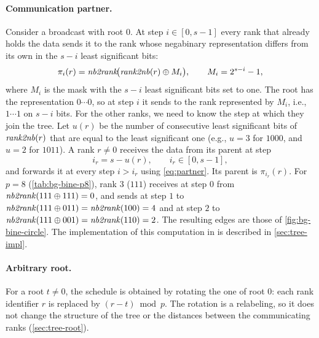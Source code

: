 \paragraph{Communication partner.}
Consider a broadcast with root $0$.
At step $i\in[0,s-1]$ every rank that already holds the data sends it to the rank whose negabinary representation differs from its own in the $s-i$ least significant bits:
\begin{equation}
  \pi_i(r)=\mathit{nb2rank}\!\bigl(\mathit{rank2nb}(r)\oplus M_i\bigr),\qquad M_i=2^{s-i}-1,
  \label{eq:partner}
\end{equation}
where $M_i$ is the mask with the $s-i$ least significant bits set to one.
The root has the representation $0\cdots0$, so at step $i$ it sends to the rank represented by $M_i$, i.e., $1\cdots1$ on $s-i$ bits.
For the other ranks, we need to know the step at which they join the tree.
Let $u(r)$ be the number of consecutive least significant bits of $\mathit{rank2nb}(r)$ that are equal to the least significant one (e.g., $u=3$ for $1000$, and $u=2$ for $1011$).
A rank $r\neq0$ receives the data from its parent at step
\begin{equation}
  i_r=s-u(r),\qquad i_r\in[0,s-1],
  \label{eq:recv-step}
\end{equation}
and forwards it at every step $i>i_r$ using \cref{eq:partner}.
Its parent is $\pi_{i_r}(r)$.
For $p=8$ (\cref{tab:bg-bine-p8}), rank $3$ ($111$) receives at step $0$ from $\mathit{nb2rank}(111\oplus111)=0$, and sends at step $1$ to $\mathit{nb2rank}(111\oplus011)=\mathit{nb2rank}(100)=4$ and at step $2$ to $\mathit{nb2rank}(111\oplus001)=\mathit{nb2rank}(110)=2$.
The resulting edges are those of \cref{fig:bg-bine-circle}.
The implementation of this computation in \nccl{} is described in \cref{sec:tree-impl}.

\paragraph{Arbitrary root.}
For a root $t\neq0$, the schedule is obtained by rotating the one of root $0$: each rank identifier $r$ is replaced by $(r-t)\bmod p$.
The rotation is a relabeling, so it does not change the structure of the tree or the distances between the communicating ranks (\cref{sec:tree-root}).


